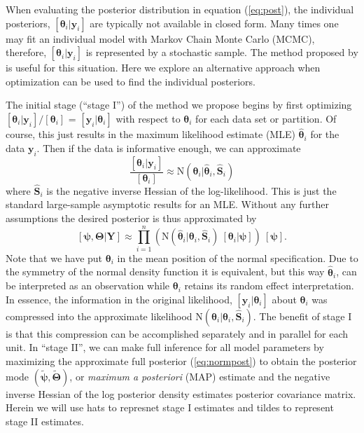 \documentclass[12pt]{article}
\newcommand{\by}{\mathbf{y}}
\newcommand{\bt}{\boldsymbol{\theta}}
\newcommand{\bT}{\boldsymbol{\Theta}}
\newcommand{\bp}{\boldsymbol{\psi}}
\newcommand{\bS}{\mathbf{S}}
\newcommand{\bY}{\mathbf{Y}}
\begin{document}
When evaluating the posterior distribution in equation (\ref{eq:post}), the individual posteriors, $[\bt_i|\by_i]$ are typically not available in closed form. Many times one may fit an individual model with Markov Chain Monte Carlo (MCMC), therefore, $[\bt_i|\by_i]$ is represented by a stochastic sample. The method proposed by \citet{lunn2013fully} is useful for this situation. Here we explore an alternative approach when optimization can be used to find the individual posteriors.

The initial stage (``stage I'') of the method we propose begins by first optimizing $[\bt_i|\by_i]/[\bt_i]$ = $[\by_i|\bt_i]$ with respect to $\bt_i$ for each data set or partition. Of course, this just results in the maximum likelihood estimate (MLE) $\hat{\bt}_i$ for the data $\by_i$. Then if the data is informative enough, we can approximate 
\[
\frac{[\bt_i|\by_i]}{[\bt_i]} \approx \text{N}(\bt_i|\hat{\bt}_i, \hat{\bS}_i)
\]
where $\hat{\bS}_i$ is the negative inverse Hessian of the log-likelihood. This is just the standard large-sample asymptotic results for an MLE. Without any further assumptions the desired posterior is thus approximated by
\begin{equation}
\label{eq:normpost}
[\bp,\bT|\bY] \approx  \prod_{i=1}^n\left(\text{N}(\hat{\bt}_i|\bt_i, \hat{\bS}_i)\ [\bt_i|\bp]\right)\ [\bp].
\end{equation}
Note that we have put $\bt_i$ in the mean position of the normal specification. Due to the symmetry of the normal density function it is equivalent, but this way $\hat{\bt}_i$, can be interpreted as an observation while $\bt_i$ retains its random effect interpretation. In essence, the information in the original likelihood, $[\by_i|\bt_i]$ about $\bt_i$ was compressed into the approximate likelihood $\text{N}(\hat{\bt}_i|\bt_i, \hat{\bS}_i)$. The benefit of stage I is that this compression can be accomplished separately and in parallel for each unit. In ``stage II'', we can make full inference for all model parameters by maximizing the approximate full posterior (\ref{eq:normpost}) to obtain the posterior mode $(\tilde{\bp},\tilde{\bT})$, or {\it maximum a posteriori} (MAP) estimate and the negative inverse Hessian of the log posterior density estimates posterior covariance matrix. Herein we will use hats to represnet stage I estimates and tildes to represent stage II estimates.
\end{document}
